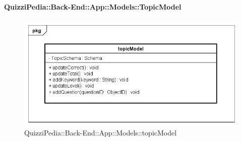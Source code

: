 \paragraph{QuizziPedia::Back-End::App::Models::TopicModel}
\label{QuizziPedia::Back-End::App::Models::topicModel}
\begin{figure}
	\centering
	\includegraphics[scale=0.45]{UML/Package/QuizziPedia_Back-End_App_Models_topicModel.png}
	\caption{QuizziPedia::Back-End::App::Models::topicModel}
\end{figure}
